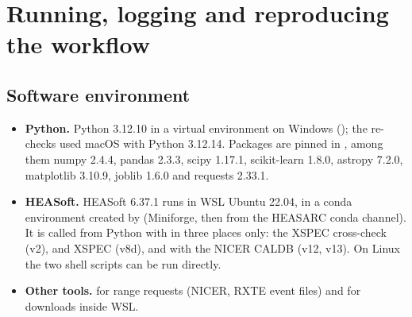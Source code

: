 \section{Running, logging and reproducing the workflow}\label{sec:operations}

\subsection{Software environment}\label{sec:env}
\begin{itemize}
\item \textbf{Python.} Python 3.12.10 in a virtual environment on Windows (); the re-checks used
macOS with Python 3.12.14. Packages are pinned in , among them numpy 2.4.4, pandas 2.3.3,
scipy 1.17.1, scikit-learn 1.8.0, astropy 7.2.0, matplotlib 3.10.9, joblib 1.6.0 and requests 2.33.1.
\item \textbf{HEASoft.} HEASoft 6.37.1 runs in WSL Ubuntu 22.04, in a conda environment  created by
 (Miniforge, then  from the HEASARC conda channel).
It is called from Python with  in three places only: the XSPEC
cross-check (v2),  and XSPEC  (v8d), and  with the NICER CALDB (v12, v13). On Linux
the two shell scripts can be run directly.
\item \textbf{Other tools.}  for range requests (NICER, RXTE event files) and for downloads inside WSL.
\end{itemize}

